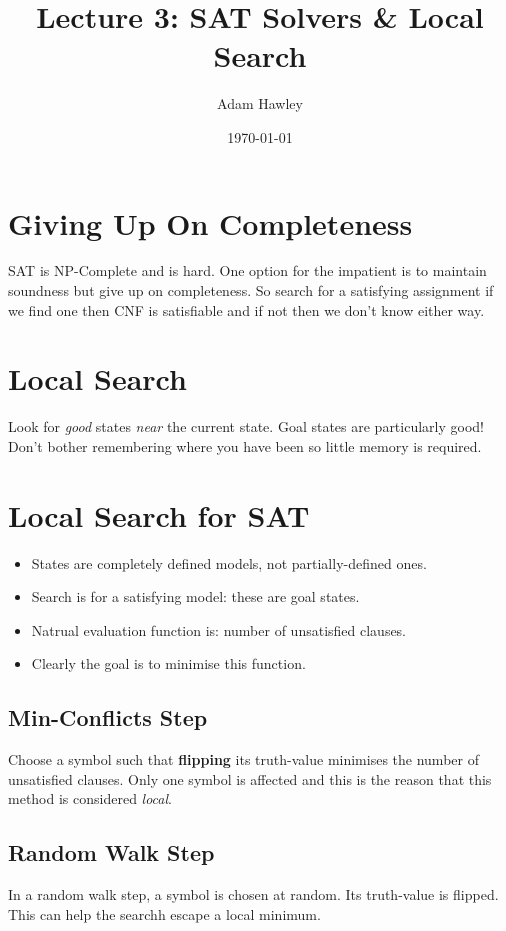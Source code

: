 \documentclass[11pt]{article}
\author{Adam Hawley}
\date{\today}
\title{Lecture 3: SAT Solvers \& Local Search}
\begin{document}
\maketitle
\tableofcontents


\section{Giving Up On Completeness}
\label{sec:orgfdda17d}
SAT is NP-Complete and is hard.
One option for the impatient is to maintain soundness but give up on completeness.
So search for a satisfying assignment if we find one then CNF is satisfiable and if not then we don't know either way.

\section{Local Search}
\label{sec:org3c757ab}
Look for \emph{good} states \emph{near} the current state.
Goal states are particularly good!
Don't bother remembering where you have been so little memory is required.

\section{Local Search for SAT}
\label{sec:org2c79fdd}
\begin{itemize}
\item States are completely defined models, not partially-defined ones.
\item Search is for a satisfying model: these are goal states.
\item Natrual evaluation function is: number of unsatisfied clauses.
\item Clearly the goal is to minimise this function.
\end{itemize}

\subsection{Min-Conflicts Step}
\label{sec:org6abcf7a}
Choose a symbol such that \textbf{flipping} its truth-value minimises the number of unsatisfied clauses.
Only one symbol is affected and this is the reason that this method is considered \emph{local}.

\subsection{Random Walk Step}
\label{sec:org2ad3ad1}
In a random walk step, a symbol is chosen at random.
Its truth-value is flipped.
This can help the searchh escape a local minimum.
\end{document}
